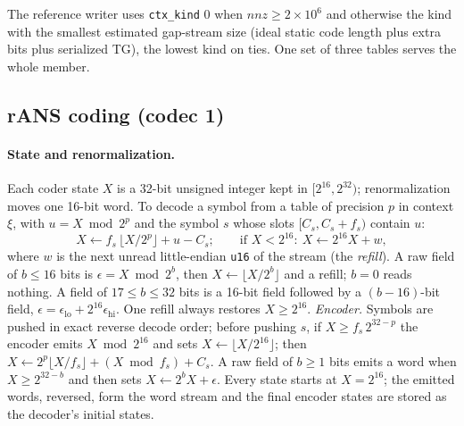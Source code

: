 The reference writer uses \texttt{ctx\_kind} 0 when $\mathit{nnz}\ge 2\times10^6$ and otherwise
the kind with the smallest estimated gap-stream size (ideal static code length plus extra bits plus serialized TG),
the lowest kind on ties. One set of three tables serves the whole member.

\subsection{rANS coding (codec 1)}
\label{spec:rans}
\paragraph{State and renormalization.}
Each coder state $X$ is a 32-bit unsigned integer kept in $[2^{16},2^{32})$; renormalization moves one 16-bit word.
To decode a symbol from a table of precision $p$ in context $\xi$, with $u=X\bmod 2^{p}$ and the symbol $s$ whose
slots $[C_s,C_s+f_s)$ contain $u$:
\begin{equation}
X\leftarrow f_s\,\lfloor X/2^{p}\rfloor+u-C_s;\qquad \text{if }X<2^{16}:\ X\leftarrow 2^{16}X+w,
\label{spec:eq:dec}
\end{equation}
where $w$ is the next unread little-endian \texttt{u16} of the stream (the \emph{refill}). A raw field of $b\le16$ bits
is $\epsilon=X\bmod 2^{b}$, then $X\leftarrow\lfloor X/2^{b}\rfloor$ and a refill; $b=0$ reads nothing. A field of
$17\le b\le 32$ bits is a 16-bit field followed by a $(b-16)$-bit field, $\epsilon=\epsilon_{\mathrm{lo}}+2^{16}\epsilon_{\mathrm{hi}}$.
One refill always restores $X\ge 2^{16}$.
\emph{Encoder.} Symbols are pushed in exact reverse decode order; before pushing $s$, if
$X\ge f_s\,2^{32-p}$ the encoder emits $X\bmod 2^{16}$ and sets $X\leftarrow\lfloor X/2^{16}\rfloor$; then
$X\leftarrow 2^{p}\lfloor X/f_s\rfloor+(X\bmod f_s)+C_s$. A raw field of $b\ge1$ bits emits a word when
$X\ge 2^{32-b}$ and then sets $X\leftarrow 2^{b}X+\epsilon$. Every state starts at $X=2^{16}$; the emitted words,
reversed, form the word stream and the final encoder states are stored as the decoder's initial states.

